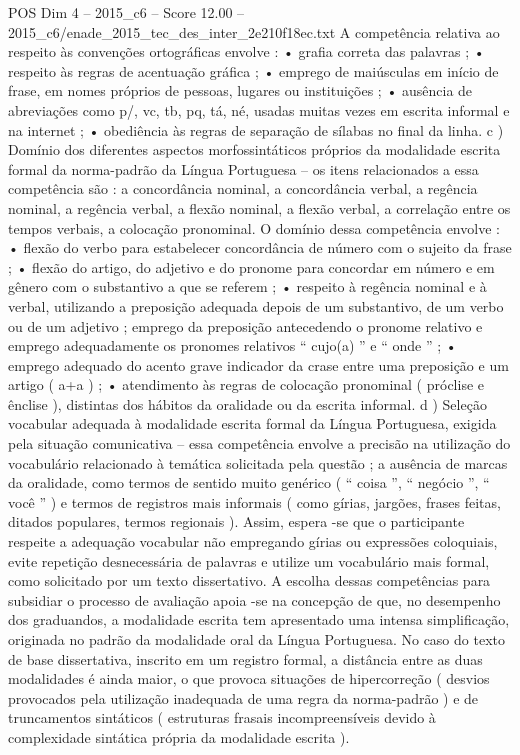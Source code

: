 \begin{textsample}{POS Dim 4 – 2015\_c6 – Score 12.00 – 2015\_c6/enade\_2015\_tec\_des\_inter\_2e210f18ec.txt}
A competência relativa ao respeito às convenções ortográficas envolve : • grafia correta das palavras ; • respeito às regras de acentuação gráfica ; • emprego de maiúsculas em início de frase, em nomes próprios de pessoas, lugares ou instituições ; • ausência de abreviações como p/, vc, tb, pq, tá, né, usadas muitas vezes em escrita informal e na internet ; • obediência às regras de separação de sílabas no final da linha. c ) Domínio dos diferentes aspectos morfossintáticos próprios da modalidade escrita formal da norma-padrão da Língua Portuguesa – os itens relacionados a essa competência são : a concordância nominal, a concordância verbal, a regência nominal, a regência verbal, a flexão nominal, a flexão verbal, a correlação entre os tempos verbais, a colocação pronominal.
O domínio dessa competência envolve : • flexão do verbo para estabelecer concordância de número com o sujeito da frase ; • flexão do artigo, do adjetivo e do pronome para concordar em número e em gênero com o substantivo a que se referem ; • respeito à regência nominal e à verbal, utilizando a preposição adequada depois de um substantivo, de um verbo ou de um adjetivo ; emprego da preposição antecedendo o pronome relativo e emprego adequadamente os pronomes relativos “ cujo(a) ” e “ onde ” ; • emprego adequado do acento grave indicador da crase entre uma preposição e um artigo ( a+a ) ; • atendimento às regras de colocação pronominal ( próclise e ênclise ), distintas dos hábitos da oralidade ou da escrita informal. d ) Seleção vocabular adequada à modalidade escrita formal da Língua Portuguesa, exigida pela situação comunicativa – essa competência envolve a precisão na utilização do vocabulário relacionado à temática solicitada pela questão ; a ausência de marcas da oralidade, como termos de sentido muito genérico ( “ coisa ”, “ negócio ”, “ você ” ) e termos de registros mais informais ( como gírias, jargões, frases feitas, ditados populares, termos regionais ).
Assim, espera -se que o participante respeite a adequação vocabular não empregando gírias ou expressões coloquiais, evite repetição desnecessária de palavras e utilize um vocabulário mais formal, como solicitado por um texto dissertativo.
A escolha dessas competências para subsidiar o processo de avaliação apoia -se na concepção de que, no desempenho dos graduandos, a modalidade escrita tem apresentado uma intensa simplificação, originada no padrão da modalidade oral da Língua Portuguesa.
No caso do texto de base dissertativa, inscrito em um registro formal, a distância entre as duas modalidades é ainda maior, o que provoca situações de hipercorreção ( desvios provocados pela utilização inadequada de uma regra da norma-padrão ) e de truncamentos sintáticos ( estruturas frasais incompreensíveis devido à complexidade sintática própria da modalidade escrita ).

\end{textsample}
